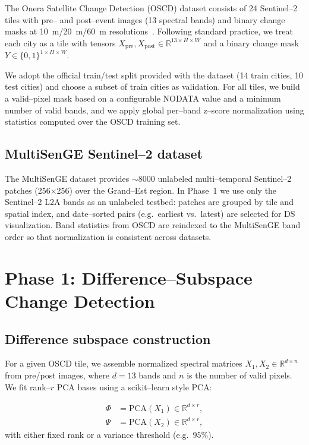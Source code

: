 \documentclass[twoside,11pt]{article}
\begin{document}
The Onera Satellite Change Detection (OSCD) dataset consists of 24 Sentinel--2
tiles with pre-- and post--event images (13 spectral bands) and binary change
masks at \SI{10}{\metre}/\SI{20}{\metre}/\SI{60}{\metre}
resolutions~\cite{Daudt2018}. Following standard practice, we treat each city
as a tile with tensors
\(
X_{\text{pre}}, X_{\text{post}} \in \mathbb{R}^{13 \times H \times W}
\)
and a binary change mask
\(Y \in \{0,1\}^{1 \times H \times W}\).

We adopt the official train/test split provided with the dataset (14 train
cities, 10 test cities) and choose a subset of train cities as validation. For
all tiles, we build a valid--pixel mask based on a configurable NODATA value
and a minimum number of valid bands, and we apply global per--band z--score
normalization using statistics computed over the OSCD training set.

\subsection{MultiSenGE Sentinel--2 dataset}

The MultiSenGE dataset provides \(\sim\!8000\) unlabeled
multi--temporal Sentinel--2 patches (256\(\times\)256) over the Grand--Est
region. In Phase~1 we use only the Sentinel--2 L2A bands as an unlabeled
testbed: patches are grouped by tile and spatial index, and date--sorted
pairs (e.g.\ earliest vs.\ latest) are selected for DS visualization. Band
statistics from OSCD are reindexed to the MultiSenGE band order so that
normalization is consistent across datasets.

\section{Phase 1: Difference--Subspace Change Detection}

\subsection{Difference subspace construction}

For a given OSCD tile, we assemble normalized spectral matrices
\(
X_1, X_2 \in \mathbb{R}^{d \times n}
\)
from pre/post images, where \(d=13\) bands and \(n\) is the number of valid
pixels. We fit rank--\(r\) PCA bases using a scikit--learn style PCA:

\begin{align}
\Phi &= \text{PCA}(X_1) \in \mathbb{R}^{d \times r},\\
\Psi &= \text{PCA}(X_2) \in \mathbb{R}^{d \times r},
\end{align}
with either fixed rank or a variance threshold (e.g.\ \(95\%\)).
\end{document}

